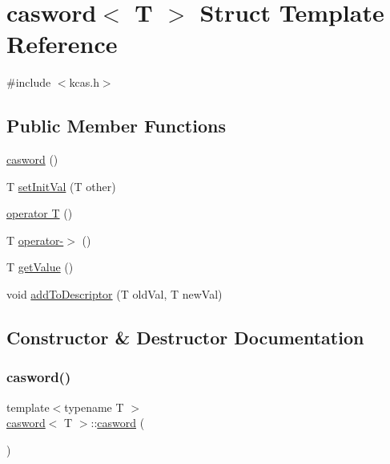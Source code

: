\hypertarget{structcasword}{}\section{casword$<$ T $>$ Struct Template Reference}
\label{structcasword}


{\ttfamily \#include $<$kcas.\+h$>$}

\subsection*{Public Member Functions}
\begin{DoxyCompactItemize}
\item 
\hyperlink{structcasword_a2325ef306dec004288a063b1a64e43e5}{casword} ()
\item 
T \hyperlink{structcasword_af443268d0da3bee38b712912850210e6}{set\+Init\+Val} (T other)
\item 
\hyperlink{structcasword_a5b967f1ba3c54143e7ff37870831cf43}{operator T} ()
\item 
T \hyperlink{structcasword_ab6b758d075768501b8915eebf602c54e}{operator-\/$>$} ()
\item 
T \hyperlink{structcasword_a815838a9e00061deaef7e5596bb5e8bf}{get\+Value} ()
\item 
void \hyperlink{structcasword_ae9521db09e9366bb31156bc78830b760}{add\+To\+Descriptor} (T old\+Val, T new\+Val)
\end{DoxyCompactItemize}


\subsection{Constructor \& Destructor Documentation}
\mbox{\label{structcasword_a2325ef306dec004288a063b1a64e43e5}} 
\subsubsection{\texorpdfstring{casword()}{casword()}}
{\footnotesize\ttfamily template$<$typename T $>$ \\
\hyperlink{structcasword}{casword}$<$ T $>$\+::\hyperlink{structcasword}{casword} (\begin{DoxyParamCaption}{ }\end{DoxyParamCaption})}



